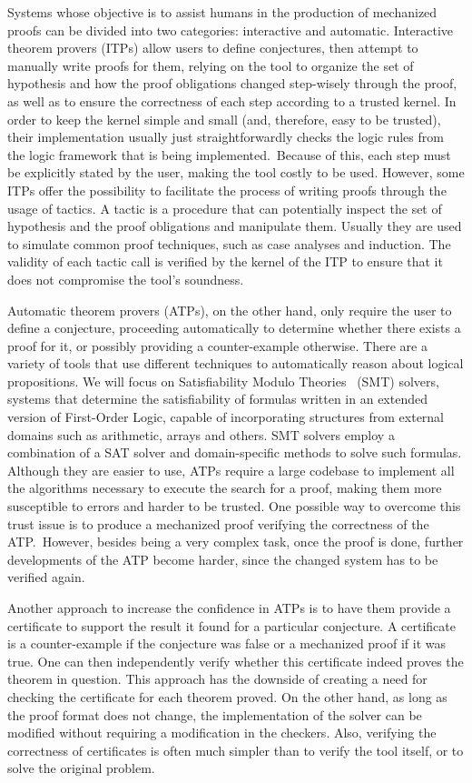 Systems whose objective is to assist humans in the production of mechanized proofs
can be divided into two categories:
interactive and automatic.
Interactive theorem provers (ITPs) allow users to define
conjectures, then attempt to manually write proofs for them,
relying on the tool to organize the set of hypothesis and
how the proof obligations changed step-wisely through the
proof, as well as to ensure the correctness of each step
according to a trusted kernel.
%
In order to keep the kernel simple and small (and, therefore,
easy to be trusted), their implementation usually just
straightforwardly checks the logic rules from the logic framework
that is being implemented.\ Because of this, each step must be
explicitly stated by the user, making the tool costly to be
used. However, some ITPs offer the possibility to facilitate
the process of writing proofs through the usage of tactics.
A tactic is a procedure that can potentially inspect the
set of hypothesis and the proof obligations and manipulate
them. Usually they are used to simulate common proof
techniques, such as case analyses and induction. The
validity of each tactic call is verified by the kernel
of the ITP to ensure that it does not compromise the tool's
soundness.

Automatic theorem provers (ATPs), on the other hand,
only require the user to define a conjecture, proceeding
automatically to determine whether there exists a proof
for it, or possibly providing a counter-example otherwise.
%
There are a variety of tools that use different
techniques to automatically reason about logical propositions.
We will focus on Satisfiability Modulo Theories~\cite[ch. 33]{handbook} (SMT) solvers, systems
that determine the satisfiability of formulas written in an
extended version of First-Order Logic,
capable of incorporating structures from external domains such as arithmetic,
arrays and others. SMT solvers employ a combination of a SAT solver and
domain-specific methods to solve such formulas.
%
Although they are easier to use, ATPs require a large
codebase to implement all the algorithms necessary to execute
the search for a proof, making them more susceptible to
errors and harder to be trusted. One possible way to overcome
this trust issue is to produce a mechanized proof verifying
the correctness of the ATP.\ However, besides being a very
complex task, once the proof is done, further developments of
the ATP become harder, since the changed system has to be
verified again.

Another approach to increase the confidence in ATPs is to have them provide a
certificate to support the result it found for a particular conjecture. A certificate
is a counter-example if the conjecture was false or a mechanized proof if it was true.
One can then independently verify whether this certificate indeed proves the theorem in question.
This approach has the downside of creating a need
for checking the certificate for each theorem proved.
On the other hand, as long as the proof format does not change, the implementation
of the solver can be modified without requiring a modification in the checkers. Also,
verifying the correctness of certificates is often much simpler than to verify
the tool itself, or to solve the original problem.

